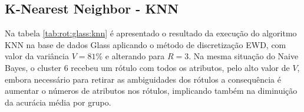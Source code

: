 \subsection{K-Nearest Neighbor - KNN} \label{cap:resultados:ssec:glass:knn}


Na tabela \ref{tab:rot:glass:knn} é apresentado o resultado da execução do algoritmo KNN na base de dados Glass aplicando o método de discretização EWD, com valor da variância ${V=81\%}$ e alterando para ${R=3}$. Na mesma situação do Naive Bayes, o cluster 6 recebeu um rótulo com todos os atributos, pelo alto valor de ${V}$, embora necessário para retirar as ambiguidades dos rótulos a consequência é aumentar o números de atributos nos rótulos, implicando também na diminuição da acurácia média por grupo. 

\newpage
\begin{table}[!h]
\centering
\caption{Resultado da aplicação do algoritmo KNN}
\label{tab:rot:glass:knn}
\end{table}
